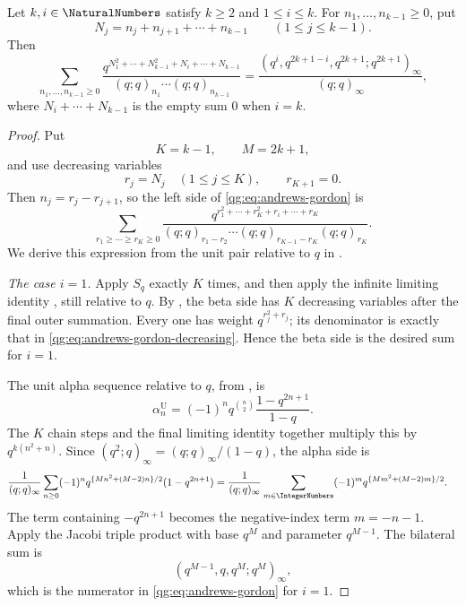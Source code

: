 \begin{theorem}
\label{qg:thm-andrews-gordon}
Let \(k,i\in\NaturalNumbers\) satisfy \(k\ge2\) and \(1\le i\le k\).  For
\(n_1,\ldots,n_{k-1}\ge0\), put
\[
  N_j=n_j+n_{j+1}+\cdots+n_{k-1}
  \qquad(1\le j\le k-1).
\]
Then
\begin{equation}
 \sum_{n_1,\ldots,n_{k-1}\ge0}
 \frac{
 q^{N_1^2+\cdots+N_{k-1}^2+N_i+\cdots+N_{k-1}}}
 {(q;q)_{n_1}\cdots(q;q)_{n_{k-1}}}
 =
 \frac{(q^i,q^{2k+1-i},q^{2k+1};q^{2k+1})_\infty}
      {(q;q)_\infty},
 \label{qg:eq:andrews-gordon}
\end{equation}
where \(N_i+\cdots+N_{k-1}\) is the empty sum \(0\) when \(i=k\).
\end{theorem}

\begin{proof}
Put
\[
  K=k-1,\qquad M=2k+1,
\]
and use decreasing variables
\[
  r_j=N_j\quad(1\le j\le K),\qquad r_{K+1}=0.
\]
Then \(n_j=r_j-r_{j+1}\), so the left side of
\eqref{qg:eq:andrews-gordon} is
\begin{equation}
 \sum_{r_1\ge\cdots\ge r_K\ge0}
 \frac{
 q^{r_1^2+\cdots+r_K^2+r_i+\cdots+r_K}}
 {(q;q)_{r_1-r_2}\cdots
  (q;q)_{r_{K-1}-r_K}(q;q)_{r_K}}.
 \label{qg:eq:andrews-gordon-decreasing}
\end{equation}
We derive this expression from the unit pair relative to \(q\) in
.

\smallskip
\noindent\emph{The case \(i=1\).}
Apply \(S_q\) exactly \(K\) times, and then apply the infinite limiting
identity , still relative to \(q\).
By , the beta side has \(K\)
decreasing variables after the final outer summation.  Every one has weight
\(q^{r_j^2+r_j}\); its denominator is exactly that in
\eqref{qg:eq:andrews-gordon-decreasing}.  Hence the beta side is the
desired sum for \(i=1\).

The unit alpha sequence relative to \(q\), from
, is
\[
 \alpha_n^{\mathrm U}
 =(-1)^nq^{\binom n2}\frac{1-q^{2n+1}}{1-q}.
\]
The \(K\) chain steps and the final limiting identity together multiply
this by \(q^{k(n^2+n)}\).  Since
\((q^2;q)_\infty=(q;q)_\infty/(1-q)\), the alpha side is
\begin{align*}
 \frac1{(q;q)_\infty}
 \sum_{n\ge0}(-1)^n
 q^{\{Mn^2+(M-2)n\}/2}(1-q^{2n+1})
 &=
 \frac1{(q;q)_\infty}
 \sum_{m\in\IntegerNumbers}(-1)^m
 q^{\{Mm^2+(M-2)m\}/2}.
\end{align*}
The term containing \(-q^{2n+1}\) becomes the negative-index term
\(m=-n-1\).  Apply the Jacobi triple product
 with base \(q^M\) and parameter \(q^{M-1}\).
The bilateral sum is
\[
  (q^{M-1},q,q^M;q^M)_\infty,
\]
which is the numerator in \eqref{qg:eq:andrews-gordon} for
\(i=1\).


\end{proof}

